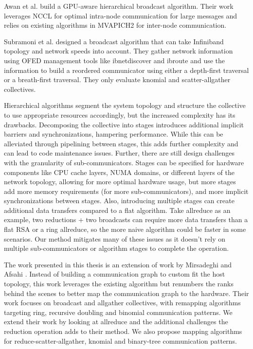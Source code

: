 Awan et al. \cite{Awan2016NCCLBcast} build a GPU-aware hierarchical broadcast algorithm.
Their work leverages NCCL for optimal intra-node communication for large messages and relies on existing algorithms in MVAPICH2 for inter-node communication.

Subramoni et al. \cite{Subramoni2011SpeedAwareBcast} designed a broadcast algorithm that can take Infiniband topology and network speeds into account.
They gather network information using OFED management tools like ibnetdiscover and ibroute and use the information to build a reordered communicator using either a depth-first traversal or a breath-first traversal.
They only evaluate knomial and scatter-allgather collectives.

Hierarchical algorithms segment the system topology and structure the collective to use appropriate resources accordingly, but the increased complexity has its drawbacks.
Decomposing the collective into stages introduces additional implicit barriers and synchronizations, hampering performance. 
While this can be alleviated through pipelining between stages, this adds further complexity and can lead to code maintenance issues.
Further, there are still design challenges with the granularity of sub-communicators.
Stages can be specified for hardware components like CPU cache layers, NUMA domains, or different layers of the network topology, allowing for more optimal hardware usage, but more stages add more memory requirements (for more sub-communicators), and more implicit synchronizations between stages.
Also, introducing multiple stages can create additional data transfers compared to a flat algorithm.
Take allreduce as an example, two reductions + two broadcasts can require more data transfers than a flat RSA or a ring allreduce, so the more naive algorithm could be faster in some scenarios. 
Our method mitigates many of these issues as it doesn't rely on multiple sub-communicators or algorithm stages to complete the operation.

The work presented in this thesis is an extension of work by Mirsadeghi and Afsahi \cite{Mirsadeghi2016TopoAwareCollRR}.
Instead of building a communication graph to custom fit the host topology, this work leverages the existing algorithm but renumbers the ranks behind the scenes to better map the communication graph to the hardware.
Their work focuses on broadcast and allgather collectives, with remapping algorithms targeting ring, recursive doubling and binomial communication patterns.
We extend their work by looking at allreduce and the additional challenges the reduction operation adds to their method.
We also propose mapping algorithms for reduce-scatter-allgather, knomial and binary-tree communication patterns.


